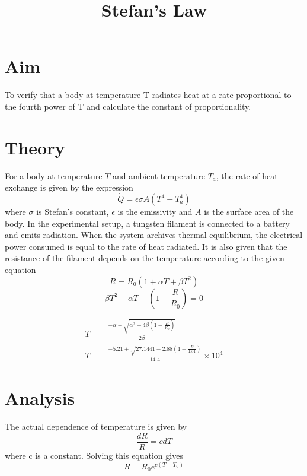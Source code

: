 \documentclass[12pt]{article}
\begin{document}
\author{}
\date{}
\title{Stefan's Law}
\maketitle
\section*{Aim}
To verify that a body at temperature T radiates heat at a rate proportional to the fourth power of T and calculate the constant of proportionality.

\section*{Theory}
For a body at temperature $T$ and ambient temperature $T_a$, the rate of heat exchange is given by the expression
\[\dot{Q}=\epsilon \sigma A(T^4 -T_a^4)\]
where $\sigma$ is Stefan's constant, $\epsilon$ is the emissivity and $A$ is the surface area of the body.
In the experimental setup, a tungsten filament is connected to a battery and emits radiation.
When the system archives thermal equilibrium, the electrical power consumed is equal to the rate of heat radiated.
It is also given that the resistance of the filament depends on the temperature according to the given equation
\[R = R_0(1+\alpha T +\beta T^2)\]
\[\beta T^2 + \alpha T + (1-\frac{R}{R_0})=0\]

\begin{align*}
    T &= \frac{-\alpha + \sqrt{\alpha ^2 -4\beta (1-\frac{R}{R_0})} }{2\beta} \\
    T &= \frac{-5.21 + \sqrt{27.1441-2.88(1-\frac{R}{1.31})}}{14.4}\times 10^4
\end{align*}
\section*{Analysis}
The actual dependence of temperature is given by
\[\frac{dR}{R}=c dT\]
where c is a constant. Solving this equation gives
\[R=R_0e^{c(T-T_0)}\]
\end{document}
